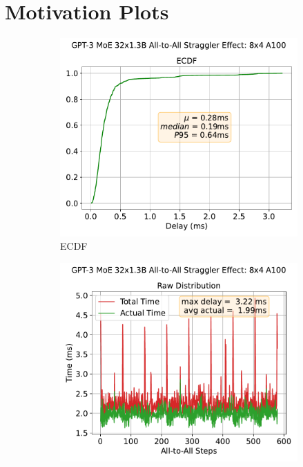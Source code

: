 \section{Motivation Plots}\label{sec:motivation-plots}
\begin{figure}[!h]
    \centering
    \begin{subfigure}{0.4\textwidth}
        \centering
        \includegraphics[width=\linewidth, keepaspectratio]{figures/GPT-3_MoE_32x1.3B_ecdf}
        \caption{ECDF}
        \label{sub:ecdf_perl}
    \end{subfigure}
    \begin{subfigure}{0.4\textwidth}
        \centering
        \includegraphics[width=\linewidth, keepaspectratio]{figures/GPT-3_MoE_32x1.3B}

\end{subfigure}
\end{figure}
